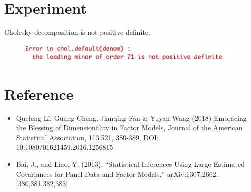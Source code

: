 \documentclass[10pt, oneside]{article}
\begin{document}

\section*{Experiment}

Cholesky decomposition is not positive definite. 
\begin{figure}[H]

  \includegraphics[width=\linewidth]{error.png}

  \label{fig: error}
    \end{figure}

\section*{Reference}

\begin{itemize}
\item Quefeng Li, Guang Cheng, Jianqing Fan \& Yuyan Wang (2018) Embracing the Blessing of Dimensionality in Factor Models, Journal of the American Statistical Association, 113:521, 380-389, DOI: 10.1080/01621459.2016.1256815


\item Bai, J., and Liao, Y. (2013), “Statistical Inferences Using Large Estimated Covariances for Panel Data and Factor Models,” arXiv:1307.2662. [380,381,382,383]
\end{itemize}
\end{document}
